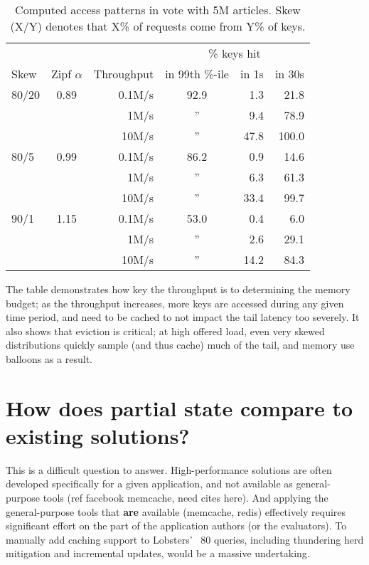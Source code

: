 \begin{table}[ht]
  \begin{center}
  \def\arraystretch{1.3}
  \begin{tabular}{ l c r c r r }
    & & & \multicolumn{3}{c}{\% keys hit} \\
    \cline{4-6}
    Skew & Zipf $\alpha$ & Throughput & in 99th \%-ile & in 1s & in 30s \\
\hline
80/20 & 0.89 & 0.1M/s & 92.9 & 1.3 & 21.8 \\
& & 1M/s & '' & 9.4 & 78.9 \\
& & 10M/s & '' & 47.8 & 100.0 \\
\hline
80/5 & 0.99 & 0.1M/s & 86.2 & 0.9 & 14.6 \\
& & 1M/s & '' & 6.3 & 61.3 \\
& & 10M/s & '' & 33.4 & 99.7 \\
\hline
90/1 & 1.15 & 0.1M/s & 53.0 & 0.4 & 6.0 \\
& & 1M/s & '' & 2.6 & 29.1 \\
& & 10M/s & '' & 14.2 & 84.3 \\
  \end{tabular}
  \end{center}
  \caption{Computed access patterns in vote with 5M articles. Skew (X/Y) denotes
  that X\% of requests come from Y\% of keys.}
  \label{f:vote-skew-table}
\end{table}

The table demonstrates how key the throughput is to determining the memory
budget; as the throughput increases, more keys are accessed during any given
time period, and need to be cached to not impact the tail latency too severely.
It also shows that eviction is critical; at high offered load, even very skewed
distributions quickly sample (and thus cache) much of the tail, and memory use
balloons as a result.

\section{How does partial state compare to existing solutions?}
\label{s:eval:existing}

This is a difficult question to answer. High-performance solutions are
often developed specifically for a given application, and not available
as general-purpose tools (ref facebook memcache, need cites here).
And applying the general-purpose tools that \textbf{are} available (memcache,
redis) effectively requires significant effort on the part of the application
authors (or the evaluators). To manually add caching support to Lobsters' ~80
queries, including thundering herd mitigation and incremental updates, would be
a massive undertaking.

